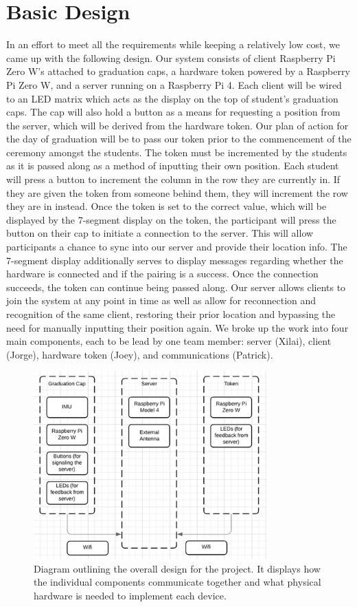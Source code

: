 \documentclass[a4paper,10pt]{article}
\begin{document}
\section{Basic Design}
In an effort to meet all the requirements while keeping a relatively low cost, we came up with the following design. Our system consists of client Raspberry Pi Zero W's attached to graduation caps, a hardware token powered by a Raspberry Pi Zero W, and a server running on a Raspberry Pi 4. Each client will be wired to an LED matrix which acts as the display on the top of student's graduation caps. The cap will also hold a button as a means for requesting a position from the server, which will be derived from the hardware token. Our plan of action for the day of graduation will be to pass our token prior to the commencement of the ceremony amongst the students. The token must be incremented by the students as it is passed along as a method of inputting their own position. Each student will press a button to increment the column in the row they are currently in. If they are given the token from someone behind them, they will increment the row they are in instead. Once the token is set to the correct value, which will be displayed by the 7-segment display on the token, the participant will press the button on their cap to initiate a connection to the server. This will allow participants a chance to sync into our server and provide their location info. The 7-segment display additionally serves to display messages regarding whether the hardware is connected and if the pairing is a success. Once the connection succeeds, the token can continue being passed along. Our server allows clients to join the system at any point in time as well as allow for reconnection and recognition of the same client, restoring their prior location and bypassing the need for manually inputting their position again. We broke up the work into four main components, each to be lead by one team member: server (Xilai), client (Jorge), hardware token (Joey), and communications (Patrick).

\begin{figure}[H]
  \centering
      \includegraphics[width=0.8\textwidth]{Assets/overview.png}
  \caption{Diagram outlining the overall design for the project. It displays how the individual components communicate together and what physical hardware is needed to implement each device.}
\end{figure}
\end{document}
